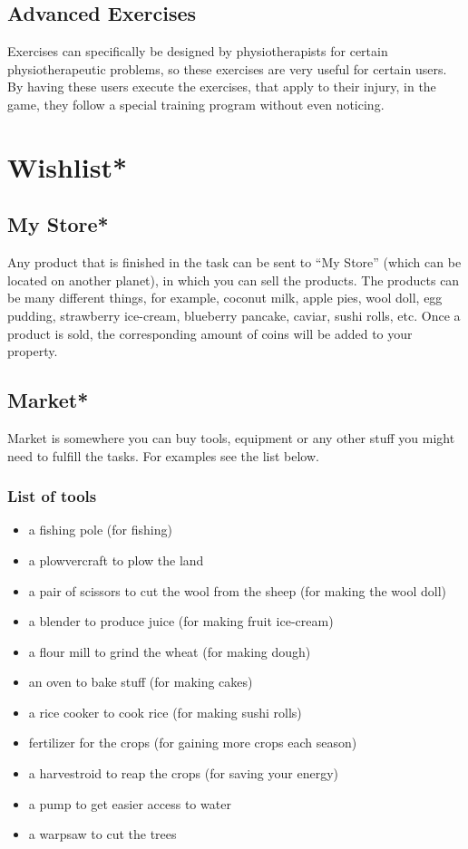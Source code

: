 \documentclass[a4paper,11pt,notitlepage]{report}
\begin{document}
\subsection{Advanced Exercises}
Exercises can specifically be designed by physiotherapists for certain physiotherapeutic problems, so these exercises are very useful for certain users. By having these users execute the exercises, that apply to their injury, in the game, they follow a special training program without even noticing. 

\section{Wishlist*}
\subsection{My Store*}
Any product that is finished in the task can be sent to “My Store” (which can be located on another planet), in which you can sell the products. The products can be many different things, for example, coconut milk, apple pies, wool doll, egg pudding, strawberry ice-cream, blueberry pancake, caviar, sushi rolls, etc. Once a product is sold, the corresponding amount of coins will be added to your property.
\subsection{Market*}
Market is somewhere you can buy tools, equipment or any other stuff you might need to fulfill the tasks. For examples see the list below.

\subsubsection{List of tools}
\begin{itemize}
\item a fishing pole (for fishing)
\item a plowvercraft to plow the land
\item a pair of scissors to cut the wool from the sheep (for making the wool doll)
\item a blender to produce juice (for making fruit ice-cream)
\item a flour mill to grind the wheat (for making dough)
\item an oven to bake stuff (for making cakes)
\item a rice cooker to cook rice (for making sushi rolls)
\item fertilizer for the crops (for gaining more crops each season)
\item a harvestroid to reap the crops (for saving your energy)
\item a pump to get easier access to water
\item a warpsaw to cut the trees
\end{itemize}
\end{document}
